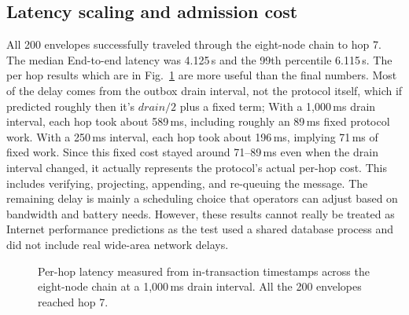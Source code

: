 \documentclass[conference,a4paper]{IEEEtran}
\begin{document}
\subsection{Latency scaling and admission cost}

All 200 envelopes successfully traveled through the eight-node chain to hop 7. The median End-to-end latency was 4.125\,s
and the 99th percentile 6.115\,s.  The per hop results which are in Fig.~\ref{fig:chain} are more useful than the final numbers. Most of the delay comes from the outbox drain interval, not the protocol itself, which if predicted roughly then it's $\mathit{drain}/2$ plus a fixed term; With a 1{,}000\,ms drain interval, each hop took about 589\,ms, including roughly an 89\,ms fixed protocol work. With a 250\,ms interval, each hop took about
196\,ms, implying 71\,ms of fixed work. Since this fixed cost stayed around 71--89\,ms even when the drain interval changed, it actually represents the protocol's actual per-hop cost. This includes verifying, projecting, appending, and re-queuing the message. The remaining delay is mainly a scheduling choice that operators can adjust based on bandwidth and battery needs. However, these results cannot really be treated as Internet performance predictions as the test used a shared database process and did not include real wide-area network delays.

\begin{figure}[t]
\centering
{}
  \caption{Per-hop latency measured from in-transaction timestamps across the eight-node chain at a 1{,}000\,ms drain interval. All the 200 envelopes reached hop 7.}
  \label{fig:chain}
\end{figure}
\end{document}
